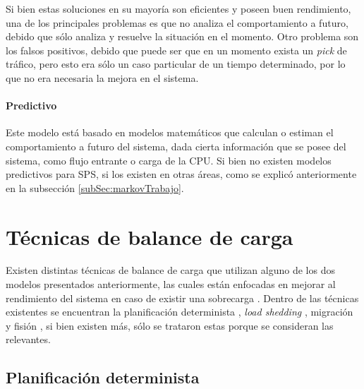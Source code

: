 Si bien estas soluciones en su mayoría son eficientes y poseen buen rendimiento, una de los principales problemas es que no analiza el comportamiento a futuro, debido que sólo analiza y resuelve la situación en el momento. Otro problema son los falsos positivos, debido que puede ser que en un momento exista un \textit{pick} de tráfico, pero esto era sólo un caso particular de un tiempo determinado, por lo que no era necesaria la mejora en el sistema.

\paragraph{Predictivo}

Este modelo está basado en modelos matemáticos que calculan o estiman el comportamiento a futuro del sistema, dada cierta información que se posee del sistema, como flujo entrante o carga de la CPU. Si bien no existen modelos predictivos para SPS, si los existen en otras áreas, como se explicó anteriormente en la subsección \ref{subSec:markovTrabajo}.

\section{Técnicas de balance de carga}
\label{sec:tecnicasBC}

Existen distintas técnicas de balance de carga que utilizan alguno de los dos modelos presentados anteriormente, las cuales están enfocadas en mejorar al rendimiento del sistema en caso de existir una sobrecarga \citep{HirzelSSGG13}. Dentro de las técnicas existentes se encuentran la planificación determinista \citep{XuCTS14, DongTS07}, \textit{load shedding} \citep{SheuC09}, migración \citep{XingZH05} y fisión \citep{GulisanoJPSV12, IshiiS11, GedikSHW14, FernandezMKP13}, si bien existen más, sólo se trataron estas porque se consideran las relevantes.

\subsection{Planificación determinista}
\label{sec:planificacionBC}

